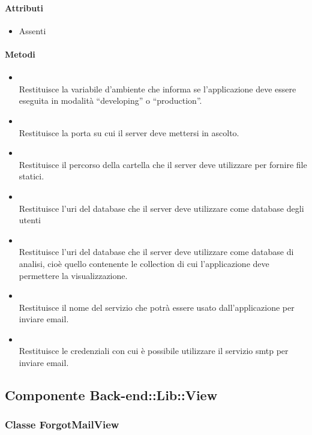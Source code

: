 \paragraph*{Attributi}
\begin{itemize}
\item[] Assenti
\end{itemize}

\paragraph*{Metodi}
\begin{itemize}
\item[]  \\ Restituisce la variabile d'ambiente che informa se l'applicazione deve essere eseguita in modalità ``developing'' o ``production''.
\item[]  \\ Restituisce la porta su cui il server deve mettersi in ascolto.
\item[]  \\ Restituisce il percorso della cartella che il server deve utilizzare per fornire file statici.
\item[]  \\ Restituisce l'uri del database che il server deve utilizzare come database degli utenti
\item[]  \\ Restituisce l'uri del database che il server deve utilizzare come database di analisi, cioè quello contenente le collection di cui l'applicazione deve permettere la visualizzazione.
\item[]  \\ Restituisce il nome del servizio che potrà essere usato dall'applicazione per inviare email.
\item[]  \\ Restituisce le credenziali con cui è possibile utilizzare il servizio smtp per inviare email.
\end{itemize}

\subsection{Componente Back-end::Lib::View}

\subsubsection{Classe ForgotMailView}

